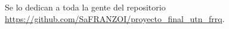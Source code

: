 Se lo dedican a toda la gente del repositorio \url{https://github.com/SaFRANZOI/proyecto_final_utn_frrq}. \\
 